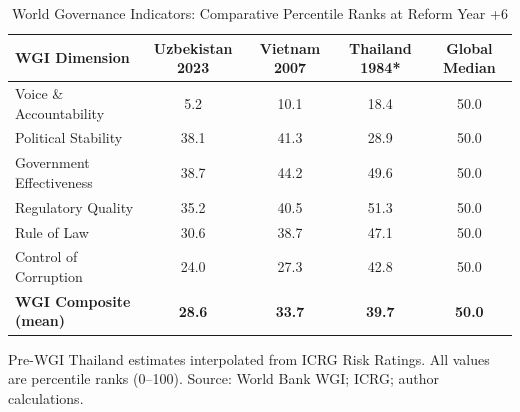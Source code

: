 \begin{table}[!h]
\centering
\caption{\label{tab:wgi}World Governance Indicators: Comparative Percentile Ranks at Reform Year +6}
\centering
\begin{threeparttable}
\begin{tabular}[t]{lcccc}
\toprule
WGI Dimension & Uzbekistan 2023 & Vietnam 2007 & Thailand 1984* & Global Median\\
\midrule
Voice \& Accountability & 5.2 & 10.1 & 18.4 & 50.0\\
Political Stability & 38.1 & 41.3 & 28.9 & 50.0\\
Government Effectiveness & 38.7 & 44.2 & 49.6 & 50.0\\
Regulatory Quality & 35.2 & 40.5 & 51.3 & 50.0\\
Rule of Law & 30.6 & 38.7 & 47.1 & 50.0\\
\addlinespace
Control of Corruption & 24.0 & 27.3 & 42.8 & 50.0\\
\textbf{\textbf{WGI Composite (mean)}} & \textbf{\textbf{28.6}} & \textbf{\textbf{33.7}} & \textbf{\textbf{39.7}} & \textbf{\textbf{50.0}}\\
\bottomrule
\end{tabular}
\begin{tablenotes}
\item * Pre-WGI Thailand estimates interpolated from ICRG Risk Ratings. All values are percentile ranks (0--100). Source: World Bank WGI; ICRG; author calculations.
\end{tablenotes}
\end{threeparttable}
\end{table}
